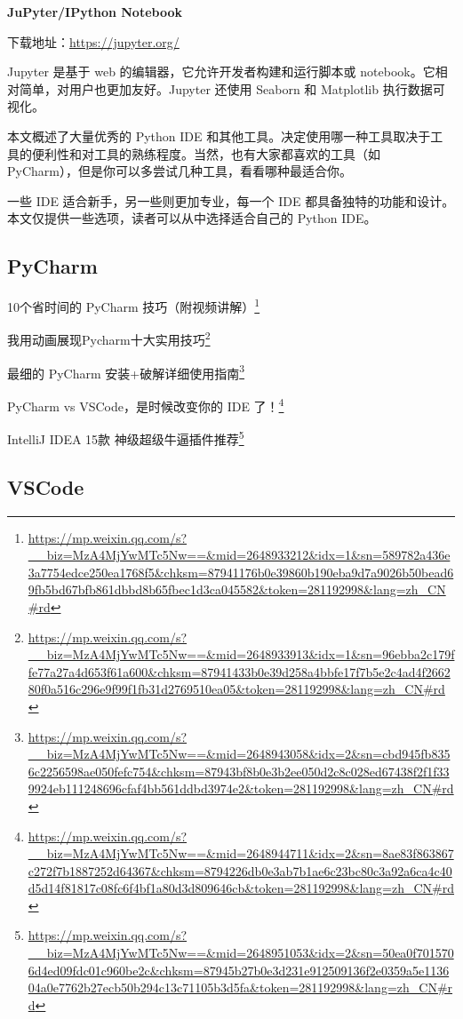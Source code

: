 \documentclass[]{ctexbook}
\renewcommand{\href}[2]{#2\footnote{\url{#1}}}
\begin{document}
\textbf{JuPyter/IPython Notebook}

下载地址：\url{https://jupyter.org/}

Jupyter 是基于 web 的编辑器，它允许开发者构建和运行脚本或 notebook。它相对简单，对用户也更加友好。Jupyter 还使用 Seaborn 和 Matplotlib 执行数据可视化。

本文概述了大量优秀的 Python IDE 和其他工具。决定使用哪一种工具取决于工具的便利性和对工具的熟练程度。当然，也有大家都喜欢的工具（如 PyCharm），但是你可以多尝试几种工具，看看哪种最适合你。

一些 IDE 适合新手，另一些则更加专业，每一个 IDE 都具备独特的功能和设计。本文仅提供一些选项，读者可以从中选择适合自己的 Python IDE。

\hypertarget{pycharm}{%
\subsection{PyCharm}\label{pycharm}}

\href{https://mp.weixin.qq.com/s?__biz=MzA4MjYwMTc5Nw==\&mid=2648933212\&idx=1\&sn=589782a436e3a7754edce250ea1768f5\&chksm=87941176b0e39860b190eba9d7a9026b50bead69fb5bd67bfb861dbbd8b65fbec1d3ca045582\&token=281192998\&lang=zh_CN\#rd}{10个省时间的 PyCharm 技巧（附视频讲解）}

\href{https://mp.weixin.qq.com/s?__biz=MzA4MjYwMTc5Nw==\&mid=2648933913\&idx=1\&sn=96ebba2c179ffe77a27a4d653f61a600\&chksm=87941433b0e39d258a4bbfe17f7b5e2c4ad4f266280f0a516c296e9f99f1fb31d2769510ea05\&token=281192998\&lang=zh_CN\#rd}{我用动画展现Pycharm十大实用技巧}

\href{https://mp.weixin.qq.com/s?__biz=MzA4MjYwMTc5Nw==\&mid=2648943058\&idx=2\&sn=cbd945fb8356c2256598ae050fefc754\&chksm=87943bf8b0e3b2ee050d2c8c028ed67438f2f1f339924eb111248696cfaf4bb561ddbd3974e2\&token=281192998\&lang=zh_CN\#rd}{最细的 PyCharm 安装+破解详细使用指南}

\href{https://mp.weixin.qq.com/s?__biz=MzA4MjYwMTc5Nw==\&mid=2648944711\&idx=2\&sn=8ae83f863867c272f7b1887252d64367\&chksm=8794226db0e3ab7b1ae6c23bc80c3a92a6ca4c40d5d14f81817c08fc6f4bf1a80d3d809646cb\&token=281192998\&lang=zh_CN\#rd}{PyCharm vs VSCode，是时候改变你的 IDE 了！}

\href{https://mp.weixin.qq.com/s?__biz=MzA4MjYwMTc5Nw==\&mid=2648951053\&idx=2\&sn=50ea0f7015706d4ed09fdc01c960be2c\&chksm=87945b27b0e3d231e912509136f2e0359a5e113604a0e7762b27ecb50b294c13c71105b3d5fa\&token=281192998\&lang=zh_CN\#rd}{IntelliJ IDEA 15款 神级超级牛逼插件推荐}

\hypertarget{vscode}{%
\subsection{VSCode}\label{vscode}}
\end{document}
